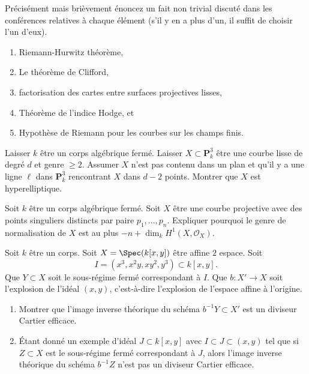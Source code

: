 \begin{exercise}[Theorems]
\label{exercise-results-spring-2018}
Précisément mais brièvement énoncez un fait non trivial discuté dans les conférences relatives à
chaque élément (s'il y en a plus d'un, il suffit de choisir
l'un d'eux).
\begin{enumerate}
\item Riemann-Hurwitz théorème,
\item Le théorème de Clifford,
\item factorisation des cartes entre surfaces projectives lisses,
\item Théorème de l'indice Hodge, et
\item Hypothèse de Riemann pour les courbes sur les champs finis.
\end{enumerate}
\end{exercise}

\begin{exercise}
\label{exercise-hyperelliptic}
Laisser $k$ être un corps algébrique fermé. Laisser $X \subset \mathbf{P}^3_k$ être une
courbe lisse de degré $d$ et genre $\geq 2$. Assumer $X$ n'est
pas contenu dans un plan et qu'il y
a une ligne $\ell$ dans $\mathbf{P}^3_k$ rencontrant $X$ dans $d - 2$
points. Montrer que $X$ est hyperelliptique.
\end{exercise}

\begin{exercise}
\label{exercise-singular}
Soit $k$ être un corps algébrique fermé. Soit $X$ être une
courbe projective avec des points singuliers distincts par paire $p_1, \ldots,
p_n$. Expliquer pourquoi le genre de normalisation de $X$ est au
plus $-n + \dim_k H^1(X, \mathcal{O}_X)$.
\end{exercise}

\begin{exercise}
\label{exercise-how-many-blowups}
Soit $k$ être un corps. Soit $X = \Spec(k[x, y])$ être affine $2$ espace.
Soit
$$
I = (x^3, x^2y, xy^2, y^3) \subset k[x, y].
$$
Que $Y \subset X$ soit le sous-régime fermé correspondant à $I$.
Que $b : X' \to X$ soit l'explosion de l'idéal $(x, y)$,
c'est-à-dire l'explosion de l'espace affine à l'origine.
\begin{enumerate}
\item Montrer que l'image inverse théorique du schéma $b^{-1}Y \subset X'$
est un diviseur Cartier efficace.
\item Étant donné un exemple d'idéal $J \subset k[x,
y]$ avec $I \subset J \subset (x, y)$ tel que si
$Z \subset X$ est le sous-régime fermé correspondant à $J$, alors l'image
inverse théorique du schéma $b^{-1}Z$ n'est pas un diviseur Cartier efficace.
\end{enumerate}
\end{exercise}


